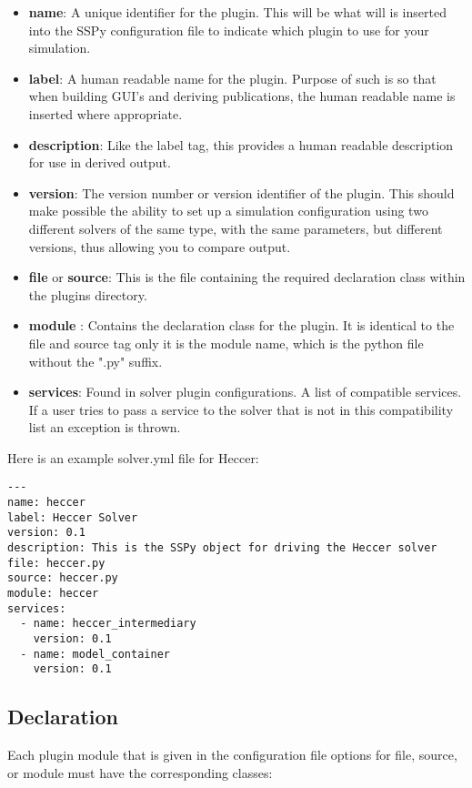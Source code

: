 \documentclass[12pt]{article}
\begin{document}
\begin{itemize}
	\item[] {\bf name}: A unique identifier for the plugin. This will be what will is inserted into the SSPy configuration file to indicate which plugin to use for your simulation.
	\item[] {\bf label}: A human readable name for the plugin. Purpose of such is so that when building GUI's and deriving publications, the human readable name is inserted where appropriate. 
	\item[] {\bf description}: Like the label tag, this provides a human readable description for use in derived output.
	\item[] {\bf version}: The version number or version identifier of the plugin. This should make possible the ability to set up a simulation configuration using two different solvers of the same type, with the same parameters, but different versions, thus allowing you to compare output.
	\item[] {\bf file} or {\bf source}: This is the file containing the required declaration class within the plugins directory. 
	\item[] {\bf module} : Contains the declaration class for the plugin. It is identical to the file and source tag only it is the module name, which is the python file without the ".py" suffix.
	\item[]{\bf services}: Found in solver plugin configurations. A list of compatible services. If a user tries to pass a service to the solver that is not in this compatibility list an exception is thrown. 
\end{itemize}

Here is an example solver.yml file for Heccer:

\begin{verbatim}
---
name: heccer
label: Heccer Solver
version: 0.1
description: This is the SSPy object for driving the Heccer solver
file: heccer.py
source: heccer.py
module: heccer
services:
  - name: heccer_intermediary
    version: 0.1
  - name: model_container
    version: 0.1

\end{verbatim}


\subsection*{Declaration}

Each plugin module that is given in the configuration file options for file, source, or module must have the corresponding classes:
\end{document}
